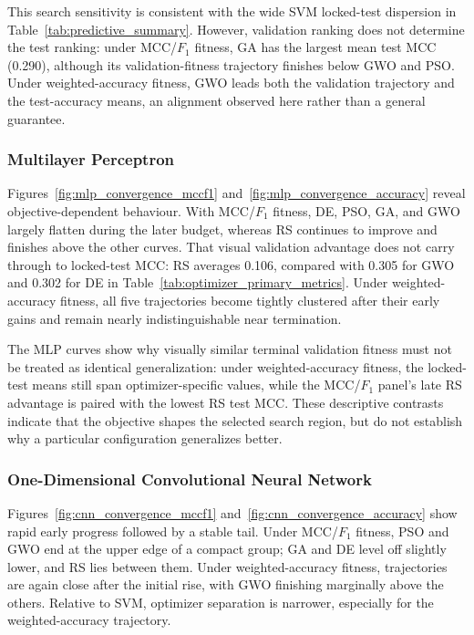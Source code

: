 This search sensitivity is consistent with the wide SVM locked-test dispersion in Table~\ref{tab:predictive_summary}. However, validation ranking does not determine the test ranking: under MCC/$F_1$ fitness, GA has the largest mean test MCC (0.290), although its validation-fitness trajectory finishes below GWO and PSO. Under weighted-accuracy fitness, GWO leads both the validation trajectory and the test-accuracy means, an alignment observed here rather than a general guarantee.


\subsubsection{Multilayer Perceptron}

Figures~\ref{fig:mlp_convergence_mccf1} and~\ref{fig:mlp_convergence_accuracy} reveal objective-dependent behaviour. With MCC/$F_1$ fitness, DE, PSO, GA, and GWO largely flatten during the later budget, whereas RS continues to improve and finishes above the other curves. That visual validation advantage does not carry through to locked-test MCC: RS averages 0.106, compared with 0.305 for GWO and 0.302 for DE in Table~\ref{tab:optimizer_primary_metrics}. Under weighted-accuracy fitness, all five trajectories become tightly clustered after their early gains and remain nearly indistinguishable near termination.

The MLP curves show why visually similar terminal validation fitness must not be treated as identical generalization: under weighted-accuracy fitness, the locked-test means still span optimizer-specific values, while the MCC/$F_1$ panel's late RS advantage is paired with the lowest RS test MCC. These descriptive contrasts indicate that the objective shapes the selected search region, but do not establish why a particular configuration generalizes better.


\subsubsection{One-Dimensional Convolutional Neural Network}

Figures~\ref{fig:cnn_convergence_mccf1} and~\ref{fig:cnn_convergence_accuracy} show rapid early progress followed by a stable tail. Under MCC/$F_1$ fitness, PSO and GWO end at the upper edge of a compact group; GA and DE level off slightly lower, and RS lies between them. Under weighted-accuracy fitness, trajectories are again close after the initial rise, with GWO finishing marginally above the others. Relative to SVM, optimizer separation is narrower, especially for the weighted-accuracy trajectory.


